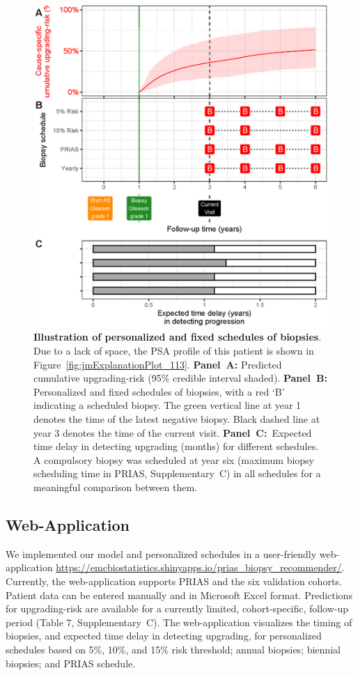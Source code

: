 \begin{figure}
\centerline{\includegraphics[width=\columnwidth]{images/demo_pat1.eps}}
\caption{\textbf{Illustration of personalized and fixed schedules of biopsies}. Due to a lack of space, the PSA profile of this patient is shown in Figure~\ref{fig:jmExplanationPlot_113}. \textbf{Panel~A:} Predicted cumulative upgrading-risk (95\% credible interval shaded). \textbf{Panel~B:} Personalized and fixed schedules of biopsies, with a red `B' indicating a scheduled biopsy. The green vertical line at year 1 denotes the time of the latest negative biopsy. Black dashed line at year 3 denotes the time of the current visit. \textbf{Panel~C:}\ Expected time delay in detecting upgrading (months) for different schedules. A compulsory biopsy was scheduled at year six (maximum biopsy scheduling time in PRIAS, Supplementary~C) in all schedules for a meaningful comparison between them.}
\label{fig:demo_pat1}
\end{figure}

\subsection{Web-Application}
We implemented our model and personalized schedules in a user-friendly web-application \url{https://emcbiostatistics.shinyapps.io/prias_biopsy_recommender/}. Currently, the web-application supports PRIAS and the six validation cohorts. Patient data can be entered manually and in Microsoft Excel format. Predictions for upgrading-risk are available for a currently limited, cohort-specific, follow-up period (Table 7, Supplementary~C). The web-application visualizes the timing of biopsies, and expected time delay in detecting upgrading, for personalized schedules based on 5\%, 10\%, and 15\% risk threshold; annual biopsies; biennial biopsies; and PRIAS schedule.